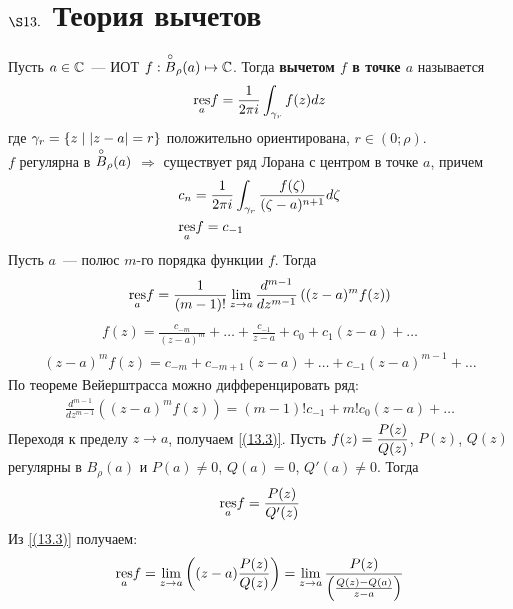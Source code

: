 \section{$\S 13.$ Теория вычетов}
\Def
Пусть $a \in \mathbb{C}$~--- ИОТ $f: \overset{\circ}{B}_\rho(a) \mapsto \mathbb{C}$. Тогда
\textbf{вычетом $f$ в точке $a$} называется
\begin{equation}\label{(13.1)}
    \underset{a}{\mathrm{res}}f = \frac{1}{2\pi i}\int_{\gamma_r}f(z)dz
\end{equation}
где $\gamma_r = \left\{{z \mid \left|{z-a}\right| = r}\right\}$ положительно ориентирована, $r \in
(0; \rho)$.
\\
\property
$f$ регулярна в $\overset{\circ}{B}_\rho(a)$ $\Rightarrow$ существует ряд Лорана с
центром в точке $a$, причем
\begin{equation}\label{(13.2)}
    \begin{split}
        & c_n = \frac{1}{2 \pi i}\int_{\gamma_r}\frac{f(\zeta)}{(\zeta - a)^{n+1}}d \zeta \\
        & \underset{a}{\mathrm{res}}f = c_{-1}
    \end{split}
\end{equation}
\lemma
Пусть $a$~--- полюс $m$-го порядка функции $f$. Тогда
\begin{equation}\label{(13.3)}
    \underset{a}{\mathrm{res}} f = \frac{1}{(m-1)!}\lim_{z \to a}\frac{d^{m-1}}{dz^{m-1}} \left( (z-a)^mf(z) \right)
\end{equation}
\pr
\begin{align*}
  f(z) = \frac{c_{-m}}{(z-a)^m} + \dots + \frac{c_{-1}}{z-a} + c_0 + c_1(z-a) + \dots
\end{align*}
\begin{align*}
  (z-a)^mf(z) = c_{-m}+ c_{-m+1}(z-a) + \dots + c_{-1}(z-a)^{m-1} + \dots
\end{align*}
По теореме Вейерштрасса можно дифференцировать ряд:
\begin{align*}
  \frac{d^{m-1}}{dz^{m-1}}\left( (z-a)^mf(z)\right) = (m-1)!c_{-1} + m!c_0(z-a) + \dots
\end{align*}
Переходя к пределу $z \to a$, получаем \eqref{(13.3)}.
\lemma
Пусть $f(z) = \displaystyle \frac{P(z)}{Q(z)}$, $P(z)$, $Q(z)$ регулярны в $B_\rho(a)$ и
$P(a) \neq 0$, $Q(a) = 0$, $Q'(a) \neq 0$. Тогда
\begin{equation}\label{(13.4)}
    \underset{a}{\mathrm{res}} f = \frac{P(z)}{Q'(z)}
\end{equation}
\pr
Из \eqref{(13.3)} получаем:
\begin{align*}
  \underset{a}{\mathrm{res}}f = \lim_{z\to a}\left( (z-a)\frac{P(z)}{Q(z)} \right) = \lim_{z \to a} \frac{P(z)}{\left( \frac{Q(z) - Q(a)}{z-a} \right)}
\end{align*}
